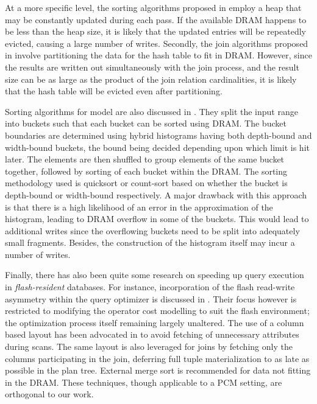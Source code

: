 At a more specific level, the sorting algorithms proposed in \cite{viglas}
employ a heap that may be constantly updated during each pass. If the
available DRAM happens to be less than the heap size, it is likely
that the updated entries will be repeatedly evicted, causing a large
number of writes. Secondly, the join algorithms proposed in \cite{viglas}
involve partitioning the data for the hash table to fit in DRAM. However,
since the results are written out simultaneously with the join process,
and the result size can be as large as the product of the join relation
cardinalities, it is likely that the hash table will be evicted even
after partitioning.

Sorting algorithms for \modelExplicit{} model are also discussed in
\cite{vamsi}. They split the input range into buckets such that each
bucket can be sorted using DRAM. The bucket boundaries are determined
using hybrid histograms having both depth-bound and width-bound buckets,
the bound being decided depending upon which limit is hit later.
The elements are then shuffled to group elements of the same bucket
together, followed by sorting of each bucket within the DRAM. The
sorting methodology used is quicksort or count-sort based on whether
the bucket is depth-bound or width-bound respectively. A major drawback
with this approach is that there is a high likelihood of an error in
the approximation of the histogram, leading to DRAM overflow in some of
the buckets. This would lead to additional writes since the overflowing
buckets need to be split into adequately small fragments. Besides,
the construction of the histogram itself may incur a number of writes.

Finally, there has also been quite some research on speeding up query
execution in \textit{flash-resident} databases. For instance, incorporation of the
flash read-write asymmetry within the query optimizer is discussed
in \cite{cost_aware}.  Their focus however is restricted to modifying the 
operator cost modelling to suit the flash environment; the optimization process
itself remaining largely unaltered. The use
of a column based layout has been advocated in \cite{graefe} to avoid
fetching of unnecessary attributes during scans. The same layout is also
leveraged for joins by fetching only the columns participating in the
join, deferring full tuple materialization to as late as possible in
the plan tree. External merge sort is recommended for data not fitting
in the DRAM. These techniques, though applicable to a PCM setting,
are orthogonal to our work.
